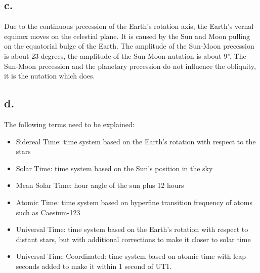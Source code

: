 \subsection*{c.}
Due to the continuous precession of the Earth's rotation axis, the Earth's vernal equinox moves on the celestial plane. It is caused by the Sun and Moon pulling on the equatorial bulge of the Earth.
The amplitude of the Sun-Moon precession is about 23 degrees, the amplitude of the Sun-Moon nutation is about 9''. The Sun-Moon precession and the planetary precession do not influence the obliquity, it is the nutation which does.

\subsection*{d.}
The following terms need to be explained:
\begin{itemize}
    \item Sidereal Time: time system based on the Earth's rotation with respect to the stars
    \item Solar Time: time system based on the Sun's position in the sky
    \item Mean Solar Time: hour angle of the sun plus 12 hours
    \item Atomic Time: time system based on hyperfine transition frequency of atoms such as Caesium-123
    \item Universal Time: time system based on the Earth's rotation with respect to distant stars, but with additional corrections to make it closer to solar time
    \item Universal Time Coordinated: time system based on atomic time with leap seconds added to make it within 1 second of UT1.
\end{itemize}